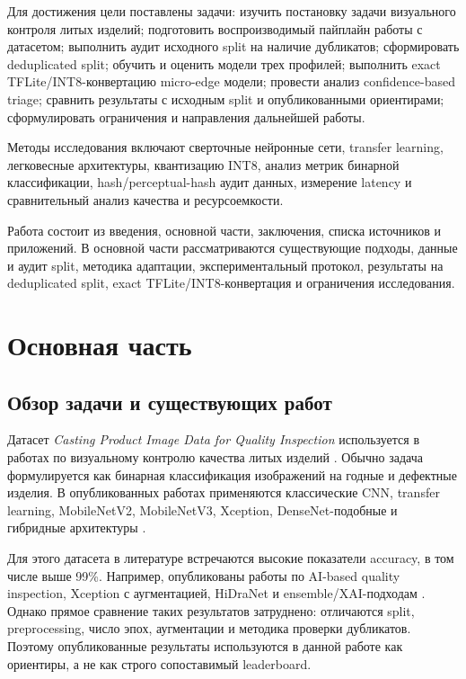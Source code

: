 \documentclass[12pt,a4paper]{article}
\begin{document}
Для достижения цели поставлены задачи: изучить постановку задачи визуального контроля литых изделий; подготовить воспроизводимый пайплайн работы с датасетом; выполнить аудит исходного split на наличие дубликатов; сформировать deduplicated split; обучить и оценить модели трех профилей; выполнить exact TFLite/INT8-конвертацию micro-edge модели; провести анализ confidence-based triage; сравнить результаты с исходным split и опубликованными ориентирами; сформулировать ограничения и направления дальнейшей работы.

Методы исследования включают сверточные нейронные сети, transfer learning, легковесные архитектуры, квантизацию INT8, анализ метрик бинарной классификации, hash/perceptual-hash аудит данных, измерение latency и сравнительный анализ качества и ресурсоемкости.

Работа состоит из введения, основной части, заключения, списка источников и приложений. В основной части рассматриваются существующие подходы, данные и аудит split, методика адаптации, экспериментальный протокол, результаты на deduplicated split, exact TFLite/INT8-конвертация и ограничения исследования.

\section{Основная часть}

\subsection{Обзор задачи и существующих работ}

Датасет \textit{Casting Product Image Data for Quality Inspection} используется в работах по визуальному контролю качества литых изделий \cite{kaggle_casting}. Обычно задача формулируется как бинарная классификация изображений на годные и дефектные изделия. В опубликованных работах применяются классические CNN, transfer learning, MobileNetV2, MobileNetV3, Xception, DenseNet-подобные и гибридные архитектуры \cite{sandler2018mobilenetv2,howard2019mobilenetv3}.

Для этого датасета в литературе встречаются высокие показатели accuracy, в том числе выше 99\%. Например, опубликованы работы по AI-based quality inspection, Xception с аугментацией, HiDraNet и ensemble/XAI-подходам \cite{smart_quality_inspection_2023,xception_casting_2023,hidranet_casting_2025,bearfusionnet_2026}. Однако прямое сравнение таких результатов затруднено: отличаются split, preprocessing, число эпох, аугментации и методика проверки дубликатов. Поэтому опубликованные результаты используются в данной работе как ориентиры, а не как строго сопоставимый leaderboard.
\end{document}
